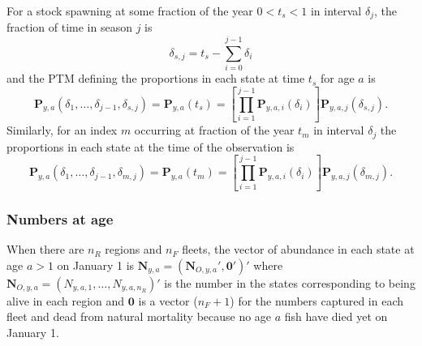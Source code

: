 \documentclass[
]{article}
\begin{document}
For a stock spawning at some fraction of the year \(0<t_s<1\) in
interval \(\delta_j\), the fraction of time in season \(j\) is
\[\delta_{s,j} = t_s-\sum^{j-1}_{i=0}\delta_i
\] and the PTM defining the proportions in each state at time \(t_s\)
for age \(a\) is \begin{equation}\label{eq:ptm_spawn}
\mathbf{P}_{y,a}\left(\delta_1,\ldots,\delta_{j-1}, \delta_{s,j}\right) = \mathbf{P}_{y,a}\left(t_s\right) =  \left[\prod^{j-1}_{i=1}\mathbf{P}_{y,a,i}(\delta_i)\right]\mathbf{P}_{y,a,j}(\delta_{s,j}).
\end{equation} Similarly, for an index \(m\) occurring at fraction of
the year \(t_m\) in interval \(\delta_j\) the proportions in each state
at the time of the observation is \begin{equation} \label{eq:ptm_index} 
\mathbf{P}_{y,a}\left(\delta_1,\ldots,\delta_{j-1}, \delta_{m,j}\right) = \mathbf{P}_{y,a}\left(t_m\right) =   \left[\prod^{j-1}_{i=1}\mathbf{P}_{y,a,i}(\delta_i)\right]\mathbf{P}_{y,a,j}(\delta_{m,j}).
\end{equation}

\hypertarget{numbers-at-age}{%
\subsubsection*{Numbers at age}\label{numbers-at-age}}

When there are \(n_R\) regions and \(n_F\) fleets, the vector of
abundance in each state at age \(a>1\) on January 1 is
\(\mathbf{N}_{y,a} = (\mathbf{N}_{O,y,a}', \mathbf{0}')'\) where
\(\mathbf{N}_{O,y,a} = (N_{y,a,1}, \ldots, N_{y,a,n_R})'\) is the number
in the states corresponding to being alive in each region and
\(\mathbf{0}\) is a vector (\(n_F+1\)) for the numbers captured in each
fleet and dead from natural mortality because no age \(a\) fish have
died yet on January 1.
\end{document}
